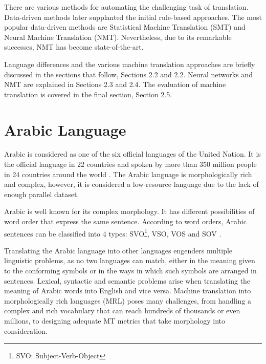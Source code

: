 There are various methods for automating the challenging task of translation. Data-driven methods later supplanted the initial rule-based approaches. The most popular data-driven methods are Statistical Machine Translation (SMT) and Neural Machine Translation (NMT). Nevertheless, due to its remarkable successes, NMT has become state-of-the-art.

Language differences and the various machine translation approaches are briefly discussed in the sections that follow, Sections 2.2 and 2.2. Neural networks and NMT are explained in Sections 2.3 and 2.4. The evaluation of machine translation is covered in the final section, Section 2.5.

\section{Arabic Language}
Arabic is considered as one of the six official languages of the United Nation. It is the official language in 22 countries and spoken by more than 350 million people in 24 countries around the world \cite{almansor18}. The Arabic language is morphologically rich and complex, however, it is considered a low-resource language due to the lack of enough parallel dataset.

Arabic is well known for its complex morphology. It has different possibilities of word order that express the same sentence. According to word orders, Arabic sentences can be classified into 4 types: SVO\footnote{SVO: Subject-Verb-Object}, VSO, VOS and SOV \cite{alqudsi14}.

Translating the Arabic language into other languages engenders multiple linguistic problems, as no two languages can match, either in the meaning given to the conforming symbols or in the ways in which such symbols are arranged in sentences. Lexical, syntactic and semantic problems arise when translating the meaning of Arabic words into English and vice versa. Machine translation into morphologically rich languages (MRL) poses many challenges, from handling a complex and rich vocabulary that can reach hundreds of thousands or even millions, to designing adequate MT metrics that take morphology into consideration. 

